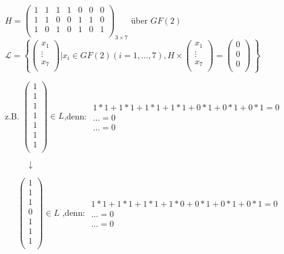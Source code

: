 \documentclass{../tudscript}
\begin{document}
\(H= \begin{pmatrix}  1 & 1 & 1 & 1 & 0 & 0 & 0\\  1 & 1 & 0 & 0 & 1 & 1 & 0\\  1 & 0 & 1 & 0 & 1 & 0 & 1\\ \end{pmatrix}_{3 \times 7}\)
über \(GF(2)\)
\(\mathcal{L}= \left\{ {\begin{pmatrix}  x_1\\  \vdots \\  x_7\\ \end{pmatrix}| x_i \in GF(2) (i=1,\dots,7),H \times \begin{pmatrix}  x_1\\  \vdots \\  x_7\\ \end{pmatrix}=\begin{pmatrix}  0\\  0\\  0\\ \end{pmatrix}~}\right \}\)

z.B.
\(\begin{pmatrix}  1\\  1\\  1\\  1\\  1\\  1\\  1\\ \end{pmatrix} \in L\),denn:
\(\left.\begin{aligned}  1*1 + 1*1 + 1*1 + 1*1 + 0*1 + 0*1 +0*1 = 0\\  \dots = 0\\  \dots = 0 \end{aligned}\right.\)

\(\qquad \enspace \downarrow\)

\({\quad} \enspace \begin{pmatrix}  1\\  1\\  1\\  0\\  1\\  1\\  1\\ \end{pmatrix} \in L\)
,denn:
\(\left.\begin{aligned}  1*1 + 1*1 + 1*1 + 1*0 + 0*1 + 0*1 +0*1 = 0\\  \dots = 0\\  \dots = 0 \end{aligned}\right.\)
\end{document}
